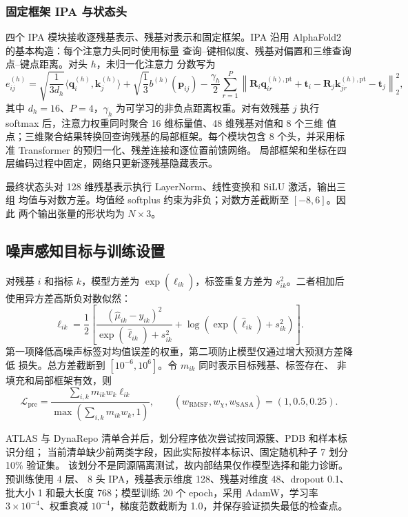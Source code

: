 \subsubsection{固定框架 IPA 与状态头}

四个 IPA 模块接收逐残基表示、残基对表示和固定框架。IPA 沿用
AlphaFold2\cite{jumper2021alphafold} 的基本构造：每个注意力头同时使用标量
查询--键相似度、残基对偏置和三维查询点--键点距离。对头 $h$，未归一化注意力
分数写为
\begin{equation}
    e_{ij}^{(h)}=
    \sqrt{\frac{1}{3d_h}}
    \langle\mathbf q_i^{(h)},\mathbf k_j^{(h)}\rangle
    +\sqrt{\frac{1}{3}}b^{(h)}(\mathbf p_{ij})
    -\frac{\gamma_h}{2}\sum_{r=1}^{P}
    \left\|
    \mathbf R_i\mathbf q_{ir}^{(h),\mathrm{pt}}+\mathbf t_i-
    \mathbf R_j\mathbf k_{jr}^{(h),\mathrm{pt}}-\mathbf t_j
    \right\|_2^2,
    \label{eq:ipa-logit}
\end{equation}
其中 $d_h=16$、$P=4$，$\gamma_h$ 为可学习的非负点距离权重。对有效残基 $j$
执行 softmax 后，注意力权重同时聚合 16 维标量值、48 维残基对值和 8 个三维
值点；三维聚合结果转换回查询残基的局部框架。每个模块包含 8 个头，并采用标准
Transformer\cite{vaswani2017attention} 的预归一化、残差连接和逐位置前馈网络。
局部框架和坐标在四层编码过程中固定，网络只更新逐残基隐藏表示。

最终状态头对 128 维残基表示执行 LayerNorm、线性变换和 SiLU 激活，输出三组
均值与对数方差。均值经 softplus 约束为非负；对数方差截断至 $[-8,6]$。因此
两个输出张量的形状均为 $N\times3$。

\subsection{噪声感知目标与训练设置}

对残基 $i$ 和指标 $k$，模型方差为 $\exp(\hat\ell_{ik})$，标签重复方差为
$s_{ik}^{2}$。二者相加后使用异方差高斯负对数似然：
\begin{equation}
    \ell_{ik}=\frac{1}{2}\left[
    \frac{(\hat\mu_{ik}-y_{ik})^2}
    {\exp(\hat\ell_{ik})+s_{ik}^{2}}
    +\log\left(\exp(\hat\ell_{ik})+s_{ik}^{2}\right)
    \right].
    \label{eq:pretraining-nll}
\end{equation}
第一项降低高噪声标签对均值误差的权重，第二项防止模型仅通过增大预测方差降低
损失。总方差截断到 $[10^{-6},10^6]$。令 $m_{ik}$ 同时表示目标残基、标签存在、
非填充和局部框架有效，则
\begin{equation}
    \mathcal L_{\mathrm{pre}}=
    \frac{\sum_{i,k}m_{ik}w_k\ell_{ik}}
    {\max(\sum_{i,k}m_{ik}w_k,1)},
    \qquad
    (w_{\mathrm{RMSF}},w_\chi,w_{\mathrm{SASA}})=(1,0.5,0.25).
    \label{eq:pretraining-loss}
\end{equation}

ATLAS 与 DynaRepo 清单合并后，划分程序依次尝试按同源簇、PDB 和样本标识分组；
当前清单缺少前两类字段，因此实际按样本标识、固定随机种子 7 划分 10\% 验证集。
该划分不是同源隔离测试，故内部结果仅作模型选择和能力诊断。预训练使用 4 层、
8 头 IPA，残基表示维度 128、残基对维度 48、dropout 0.1、批大小 1 和最大长度
768；模型训练 20 个 epoch，采用 AdamW，学习率 $3\times10^{-4}$、权重衰减
$10^{-4}$，梯度范数截断为 1.0，并保存验证损失最低的检查点。
